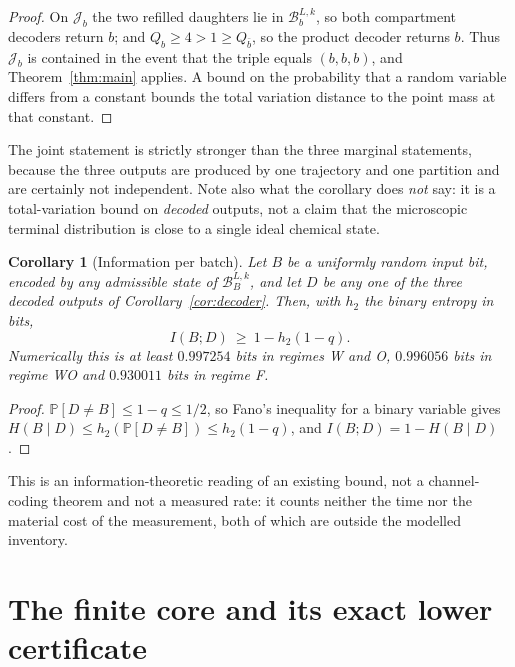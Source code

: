 \documentclass[11pt,a4paper]{article}
\theoremstyle{plain}
\newtheorem{corollary}[theorem]{Corollary}
\theoremstyle{definition}
\theoremstyle{remark}
\newcommand{\Prob}{\mathbb P}
\newcommand{\B}{\mathcal B}
\begin{document}
\begin{proof}
On $\mathcal J_b$ the two refilled daughters lie in $\B_b^{L,k}$, so both compartment
decoders return $b$; and $Q_b\ge4>1\ge Q_{\bar b}$, so the product decoder returns $b$.
Thus $\mathcal J_b$ is contained in the event that the triple equals $(b,b,b)$, and
Theorem~\ref{thm:main} applies. A bound on the probability that a random variable differs
from a constant bounds the total variation distance to the point mass at that constant.
\end{proof}

The joint statement is strictly stronger than the three marginal statements, because the
three outputs are produced by one trajectory and one partition and are certainly not
independent. Note also what the corollary does \emph{not} say: it is a total-variation
bound on \emph{decoded} outputs, not a claim that the microscopic terminal distribution
is close to a single ideal chemical state.

\begin{corollary}[Information per batch]\label{cor:fano}
Let $B$ be a uniformly random input bit, encoded by any admissible state of
$\B_B^{L,k}$, and let $D$ be any one of the three decoded outputs of
Corollary~\ref{cor:decoder}. Then, with $h_2$ the binary entropy in bits,
\begin{equation}
I(B;D)\ \ge\ 1-h_2(1-q).
\end{equation}
Numerically this is at least $0.997254$ bits in regimes W and O, $0.996056$ bits in
regime WO and $0.930011$ bits in regime F.
\end{corollary}

\begin{proof}
$\Prob[D\ne B]\le 1-q\le 1/2$, so Fano's inequality for a binary variable gives
$H(B\mid D)\le h_2(\Prob[D\ne B])\le h_2(1-q)$, and $I(B;D)=1-H(B\mid D)$.
\end{proof}

This is an information-theoretic reading of an existing bound, not a channel-coding
theorem and not a measured rate: it counts neither the time nor the material cost of the
measurement, both of which are outside the modelled inventory.

\section{The finite core and its exact lower certificate}\label{sec:core}
\end{document}
